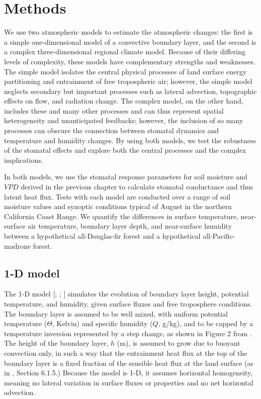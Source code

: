 \section{Methods}

We use two atmospheric models to estimate the atmospheric changes: the first is a simple one-dimensional model of a convective boundary layer, and the second is a complex three-dimensional regional climate model.  Because of their differing levels of complexity, these models have complementary strengths and weaknesses.  The simple model isolates the central physical processes of land surface energy partitioning and entrainment of free tropospheric air; however, the simple model neglects secondary but important processes such as lateral advection, topographic effects on flow, and radiation change.  The complex model, on the other hand, includes these and many other processes and can thus represent spatial heterogeneity and unanticipated feedbacks; however, the inclusion of so many processes can obscure the connection between stomatal dynamics and temperature and humidity changes.  By using both models, we test the robustness of the stomatal effects and explore both the central processes and the complex implications.

In both models, we use the stomatal response parameters for soil moisture and $VPD$ derived in the previous chapter to calculate stomatal conductance and thus latent heat flux.  Tests with each model are conducted over a range of soil moisture values and synoptic conditions typical of August in the northern California Coast Range.  We quantify the differences in surface temperature, near-surface air temperature, boundary layer depth, and near-surface humidity between a hypothetical all-Douglas-fir forest and a hypothetical all-Pacific-madrone forest.

\subsection{1-D model}
The 1-D model [\cite{tennekes1981basic}; \cite{garratt1994atmospheric}; \cite{Siqueira:2009qf}] simulates the evolution of boundary layer height, potential temperature, and humidity, given surface fluxes and free troposphere conditions.  The boundary layer is assumed to be well mixed, with uniform potential temperature ($\Theta$, Kelvin) and specific humidity ($Q$, g/kg), and to be capped by a temperature inversion represented by a step change, as shown in Figure 2 from \cite{Siqueira:2009qf}.  The height of the boundary layer, $h$ (m), is assumed to grow due to buoyant convection only, in such a way that the entrainment heat flux at the top of the boundary layer is a fixed fraction of the sensible heat flux at the land surface (as in \cite{garratt1994atmospheric}, Section 6.1.5.)  Because the model is 1-D, it assumes horizontal homogeneity, meaning no lateral variation in surface fluxes or properties and no net horizontal advection.

